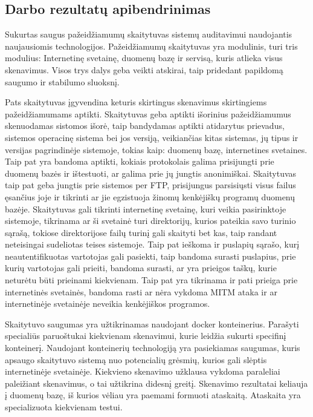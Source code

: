 \documentclass[a4paper,12pt,fleqn]{article}
\begin{document}
 
 \subsection{Darbo rezultatų apibendrinimas}
 
 Sukurtas saugus pažeidžiamumų skaitytuvas sistemų auditavimui naudojantis naujausiomis technologijos. Pažeidžiamumų skaitytuvas yra modulinis, turi tris modulius: Internetinę svetainę, duomenų bazę ir servisą, kuris atlieka visus skenavimus. Visos trys dalys geba veikti atskirai, taip pridedant papildomą saugumo ir stabilumo sluoksnį.
 
 Pats skaitytuvas įgyvendina keturis skirtingus skenavimus skirtingiems pažeidžiamumams aptikti. Skaitytuvas geba aptikti išorinius pažeidžiamumus skenuodamas sistomos išorė, taip bandydamas aptikti atidarytus prievadus, sistemos operacinę sistema bei jos versiją, veikiančias kitas sistemas, jų tipus ir versijas pagrindinėje sistemoje, tokias kaip: duomenų bazę, internetines svetaines. Taip pat yra bandoma aptikti, kokiais protokolais galima prisijungti prie duomenų bazės ir ištestuoti, ar galima prie jų jungtis anonimiškai. Skaitytuvas taip pat geba jungtis prie sistemos per FTP, prisijungus parsisiųsti visus failus ęsančius joje ir tikrinti ar jie egzistuoja žinomų kenkėjiškų programų duomenų bazėje. Skaitytuvas gali tikrinti internetinę svetainę, kuri veikia pasirinktoje sistemoje, tikrinama ar ši svetainė turi direktorijų, kurios pateikia savo turinio sąrašą, tokiose direktorijose failų turinį gali skaityti bet kas, taip randant neteisingai sudeliotas teises sistemoje. Taip pat ieškoma ir puslapių sąrašo, kurį neautentifikuotas vartotojas gali pasiekti, taip bandoma surasti puslapius, prie kurių vartotojas gali prieiti, bandoma surasti, ar yra prieigos taškų, kurie neturėtu būti prieinami kiekvienam. Taip pat yra tikrinama ir pati prieiga prie internetinės svetainės, bandoma rasti ar nėra vykdoma MITM ataka ir ar internetinėje svetainėje neveikia kenkėjiškos programos. 
 
 Skaitytuvo saugumas yra užtikrinamas naudojant docker konteinerius. Parašyti specialiūs paruoštukai kiekvienam skenavimui, kurie leidžia sukurti specifinį konteinerį. Naudojant konteinerių technologiją yra pasiekiamas saugumas, kuris apsaugo skaitytuvo sistemą nuo potencialių grėsmių, kurios gali slėptis internetinėje svetainėje. Kiekvieno skenavimo užklausa vykdoma paraleliai paleižiant skenavimus, o tai užtikrina didesnį greitį. Skenavimo rezultatai keliauja į duomenų bazę, iš kurios vėliau yra paemami formuoti ataskaitą. Ataskaita yra specializuota kiekvienam testui.
 
\end{document}
